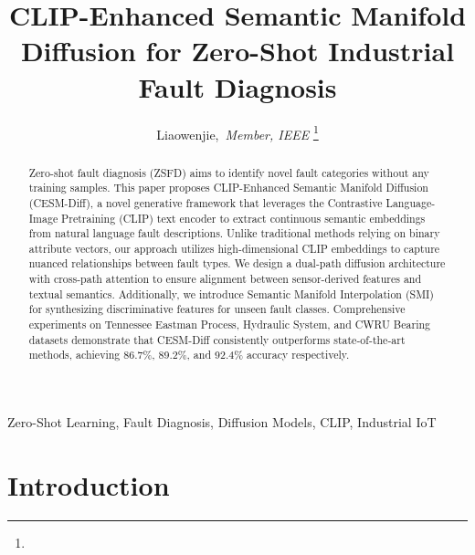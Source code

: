 \documentclass[journal,12pt,onecolumn]{IEEEtran}
\begin{document}
\title{CLIP-Enhanced Semantic Manifold Diffusion for Zero-Shot Industrial Fault Diagnosis}

\author{Liaowenjie,~\textit{Member, IEEE}
\thanks{}}

\maketitle

\begin{abstract}
Zero-shot fault diagnosis (ZSFD) aims to identify novel fault categories without any training samples. This paper proposes CLIP-Enhanced Semantic Manifold Diffusion (CESM-Diff), a novel generative framework that leverages the Contrastive Language-Image Pretraining (CLIP) text encoder to extract continuous semantic embeddings from natural language fault descriptions. Unlike traditional methods relying on binary attribute vectors, our approach utilizes high-dimensional CLIP embeddings to capture nuanced relationships between fault types. We design a dual-path diffusion architecture with cross-path attention to ensure alignment between sensor-derived features and textual semantics. Additionally, we introduce Semantic Manifold Interpolation (SMI) for synthesizing discriminative features for unseen fault classes. Comprehensive experiments on Tennessee Eastman Process, Hydraulic System, and CWRU Bearing datasets demonstrate that CESM-Diff consistently outperforms state-of-the-art methods, achieving 86.7\%, 89.2\%, and 92.4\% accuracy respectively.
\end{abstract}

\begin{IEEEkeywords}
Zero-Shot Learning, Fault Diagnosis, Diffusion Models, CLIP, Industrial IoT
\end{IEEEkeywords}

\section{Introduction}
\label{sec:intro}
\end{document}
